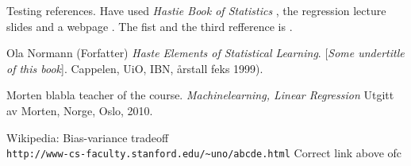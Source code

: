 \documentclass[12pt]{article}
\begin{document}
\begin{multicols}{2}
Testing references. Have used \textit{Hastie Book of Statistics} \cite{Hastie}
, the regression lecture slides \cite{Gitlink} and a webpage \cite{webpage}. The fist and the third refference is \cite{Hastie,webpage}.

\medskip

\begin{thebibliography}{9}
Ola Normann (Forfatter)
\textit{Haste Elements of Statistical Learning}.
[\textit{Some undertitle of this book}].
Cappelen, UiO, IBN, årstall feks 1999).

Morten blabla teacher of the course.
\textit{Machinelearning, Linear Regression}
Utgitt av Morten, Norge, Oslo, 2010. 
 
Wikipedia: Bias-variance tradeoff
\\\texttt{http://www-cs-faculty.stanford.edu/\~{}uno/abcde.html}
Correct link above ofc
\end{thebibliography} 
 

\end{multicols}
\end{document}
